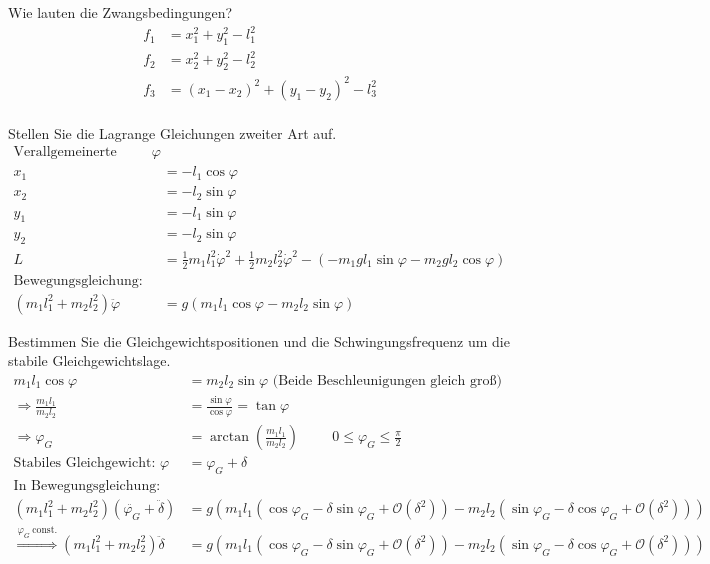 \begin{enumeralph}
	\item Wie lauten die Zwangsbedingungen?
	\begin{align*}
	f_1&=x_1^2+y_1^2-l_1^2\\
	f_2&=x_2^2+y_2^2-l_2^2\\
	f_3&=(x_1-x_2)^2+(y_1-y_2)^2-l_3^2\\
	\end{align*}
	\item Stellen Sie die Lagrange Gleichungen zweiter Art auf.
	\begin{align*}
		\text{Verallgemeinerte Koordinate: }\varphi\\
		x_1&=-l_1\cos\varphi\\
		x_2&=-l_2\sin\varphi\\
		y_1&=-l_1\sin\varphi\\
		y_2&=-l_2\sin\varphi\\
		L&=\frac{1}{2}m_1l_1^2\dot{\varphi}^2+\frac{1}{2}m_2l_2^2\dot{\varphi}^2 - (-m_1gl_1\sin\varphi-m_2gl_2\cos\varphi)\\
		\text{Bewegungsgleichung:}\\
		(m_1l_1^2+m_2l_2^2)\ddot{\varphi}&=g(m_1l_1\cos\varphi - m_2l_2\sin\varphi)
	\end{align*}
	\item Bestimmen Sie die Gleichgewichtspositionen und die Schwingungsfrequenz um die stabile Gleichgewichtslage.
	\begin{align*}
	m_1l_1\cos\varphi&=m_2l_2\sin\varphi \text{ (Beide Beschleunigungen gleich groß)}\\
	\Rightarrow\frac{m_1l_1}{m_2l_2}&=\frac{\sin\varphi}{\cos\varphi}=\tan\varphi\\
	\Rightarrow\varphi_G&=\arctan(\frac{m_1l_1}{m_2l_2})\hspace{1cm}0\leq\varphi_G\leq\frac{\pi}{2}\\
	\text{Stabiles Gleichgewicht: }\varphi &= \varphi_G + \delta\\
	\text{In Bewegungsgleichung:}\\
	(m_1l_1^2 + m_2l_2^2)(\ddot{\varphi_G} + \ddot{\delta}) &= g(m_1l_1(\cos\varphi_G-\delta\sin\varphi_G+\mathcal{O}(\delta^2))-m_2l_2(\sin\varphi_G -\delta\cos\varphi_G+\mathcal{O}(\delta^2)))\\
	\overset{\varphi_G\ \mathrm{const.}}{\Rightarrow}(m_1l_1^2 + m_2l_2^2)\ddot{\delta} &= g(m_1l_1(\cos\varphi_G-\delta\sin\varphi_G+\mathcal{O}(\delta^2))-m_2l_2(\sin\varphi_G -\delta\cos\varphi_G+\mathcal{O}(\delta^2)))\\

\end{align*}
\end{enumeralph}
